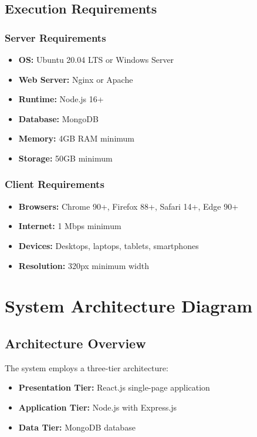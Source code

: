 \documentclass[12pt,a4paper]{report}
\begin{document}
\subsection{Execution Requirements}
\label{subsec:execution}

\subsubsection{Server Requirements}

\begin{itemize}
    \item \textbf{OS:} Ubuntu 20.04 LTS or Windows Server
    \item \textbf{Web Server:} Nginx or Apache
    \item \textbf{Runtime:} Node.js 16+
    \item \textbf{Database:} MongoDB
    \item \textbf{Memory:} 4GB RAM minimum
    \item \textbf{Storage:} 50GB minimum
\end{itemize}

\subsubsection{Client Requirements}

\begin{itemize}
    \item \textbf{Browsers:} Chrome 90+, Firefox 88+, Safari 14+, Edge 90+
    \item \textbf{Internet:} 1 Mbps minimum
    \item \textbf{Devices:} Desktops, laptops, tablets, smartphones
    \item \textbf{Resolution:} 320px minimum width
\end{itemize}

\section{System Architecture Diagram}
\label{sec:architecture}

\subsection{Architecture Overview}

The system employs a three-tier architecture:

\begin{itemize}
    \item \textbf{Presentation Tier:} React.js single-page application
    \item \textbf{Application Tier:} Node.js with Express.js
    \item \textbf{Data Tier:} MongoDB database
\end{itemize}
\end{document}
